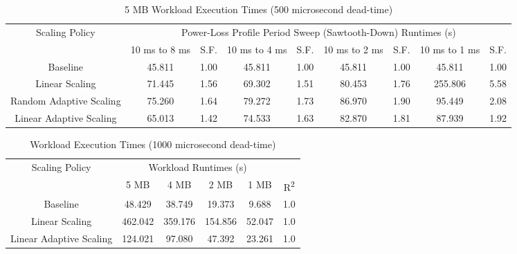 \documentclass[journal, twoside]{IEEEtran}
\begin{document}
\begin{table*}
    \renewcommand{\arraystretch}{1.3} %
    \caption{5 MB Workload Execution Times (500 microsecond dead-time)}
    \label{main-workload-results-500us}
    \centering
    \begin{tabular}{c||c|c|c|c|c|c|c|c}
        \hline
        \multirow{2}{*}{Scaling Policy} & \multicolumn{8}{c}{Power-Loss Profile Period Sweep (Sawtooth-Down) Runtimes (s)} \\\cline{2-9}
        {} & {10 ms to 8 ms} & {S.F.} & {10 ms to 4 ms} & {S.F.} & {10 ms to 2 ms} & {S.F.} & {10 ms to 1 ms} & {S.F.} \\
        \hline
        \hline
        {Baseline}                  & {45.811} & {1.00} & {45.811}  & {1.00} & {45.811} & {1.00}  & {45.811}  & {1.00}\\
        {Linear Scaling}            & {71.445} & {1.56} & {69.302}  & {1.51} & {80.453} & {1.76}  & {255.806} & {5.58}\\
        {Random Adaptive Scaling}   & {75.260} & {1.64} & {79.272}  & {1.73} & {86.970} & {1.90}  & {95.449}  & {2.08}\\
        {Linear Adaptive Scaling}   & {65.013} & {1.42} & {74.533}  & {1.63} & {82.870} & {1.81}  & {87.939}  & {1.92}\\
        \hline
    \end{tabular}
\end{table*}

\begin{table*}
    \renewcommand{\arraystretch}{1.3} %
    \caption{Workload Execution Times (1000 microsecond dead-time)}
    \label{workload-size-performance}
    \centering
    \begin{tabular}{c||c|c|c|c|c}
        \hline
        \multirow{2}{*}{Scaling Policy} & \multicolumn{4}{c|}{Workload Runtimes (s)}\\\cline{2-6}
        {} & {5 MB} & {4 MB} & {2 MB} & {1 MB} & {R\textsuperscript{2}}\\
        \hline
        \hline
        {Baseline}                  &  {48.429} &  {38.749} &  {19.373} &   {9.688} & {1.0}\\
        {Linear Scaling}            & {462.042} & {359.176} & {154.856} &  {52.047} & {1.0}\\
        {Linear Adaptive Scaling}   & {124.021} &  {97.080} &  {47.392} &  {23.261} & {1.0}\\
        \hline
    \end{tabular}
\end{table*}
\end{document}
